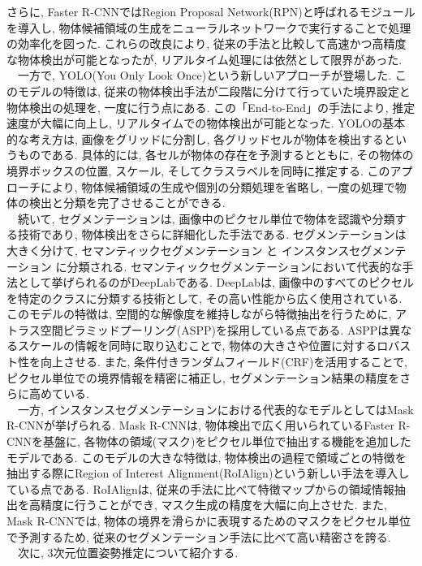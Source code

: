 さらに, Faster R-CNNではRegion Proposal Network(RPN)と呼ばれるモジュールを導入し, 物体候補領域の生成をニューラルネットワークで実行することで処理の効率化を図った. 
これらの改良により, 従来の手法と比較して高速かつ高精度な物体検出が可能となったが, リアルタイム処理には依然として限界があった. \\
　一方で, YOLO(You Only Look Once)という新しいアプローチが登場した\cite{bib:11}. 
このモデルの特徴は, 従来の物体検出手法が二段階に分けて行っていた境界設定と物体検出の処理を, 一度に行う点にある. 
この「End-to-End」の手法により, 推定速度が大幅に向上し, リアルタイムでの物体検出が可能となった. 
YOLOの基本的な考え方は, 画像をグリッドに分割し, 各グリッドセルが物体を検出するというものである. 
具体的には, 各セルが物体の存在を予測するとともに, その物体の境界ボックスの位置, スケール, そしてクラスラベルを同時に推定する. 
このアプローチにより, 物体候補領域の生成や個別の分類処理を省略し, 一度の処理で物体の検出と分類を完了させることができる. \\
　続いて, セグメンテーションは, 画像中のピクセル単位で物体を認識や分類する技術であり, 物体検出をさらに詳細化した手法である. 
セグメンテーションは大きく分けて, セマンティックセグメンテーション と インスタンスセグメンテーション に分類される. 
セマンティックセグメンテーションにおいて代表的な手法として挙げられるのがDeepLabである\cite{bib:12}. 
DeepLabは, 画像中のすべてのピクセルを特定のクラスに分類する技術として, その高い性能から広く使用されている. 
このモデルの特徴は, 空間的な解像度を維持しながら特徴抽出を行うために, アトラス空間ピラミッドプーリング(ASPP)を採用している点である. 
ASPPは異なるスケールの情報を同時に取り込むことで, 物体の大きさや位置に対するロバスト性を向上させる\cite{bib:13}. 
また, 条件付きランダムフィールド(CRF)を活用することで, ピクセル単位での境界情報を精密に補正し, セグメンテーション結果の精度をさらに高めている. \\
　一方, インスタンスセグメンテーションにおける代表的なモデルとしてはMask R-CNNが挙げられる\cite{bib:14}. 
Mask R-CNNは, 物体検出で広く用いられているFaster R-CNNを基盤に, 各物体の領域(マスク)をピクセル単位で抽出する機能を追加したモデルである. 
このモデルの大きな特徴は, 物体検出の過程で領域ごとの特徴を抽出する際にRegion of Interest Alignment(RoIAlign)という新しい手法を導入している点である. 
RoIAlignは, 従来の手法に比べて特徴マップからの領域情報抽出を高精度に行うことができ, マスク生成の精度を大幅に向上させた. 
また, Mask R-CNNでは, 物体の境界を滑らかに表現するためのマスクをピクセル単位で予測するため, 従来のセグメンテーション手法に比べて高い精密さを誇る. \\
　次に, 3次元位置姿勢推定について紹介する. 
